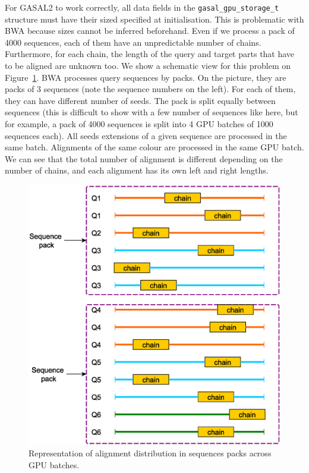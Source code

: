 For GASAL2 to work correctly, all data fields in the \texttt{gasal\_gpu\_storage\_t} structure must have their sized specified at initialisation. This is problematic with BWA because sizes cannot be inferred beforehand. Even if we process a pack of 4000 sequences, each of them have an unpredictable number of chains. Furthermore, for each chain, the length of the query and target parts that have to be aligned are unknown too. We show a schematic view for this problem on Figure~\ref{fig:cpu-gpu-batches}. BWA processes query sequences by packs. On the picture, they are packs of 3 sequences (note the sequence numbers on the left). For each of them, they can have different number of seeds. The pack is split equally between sequences (this is difficult to show with a few number of sequences like here, but for example, a pack of 4000 sequences is split into 4 GPU batches of 1000 sequences each). All seeds extensions of a given sequence are processed in the same batch. Alignments of the same colour are processed in the same GPU batch. We can see that the total number of alignment is different depending on the number of chains, and each alignment has its own left and right lengths.

\begin{figure}[h!]
	\centering
	\includegraphics[width=1\linewidth]{cpu-gpu-batches}
	\caption{Representation of alignment distribution in sequences packs across GPU batches.}
	\label{fig:cpu-gpu-batches}
\end{figure}


